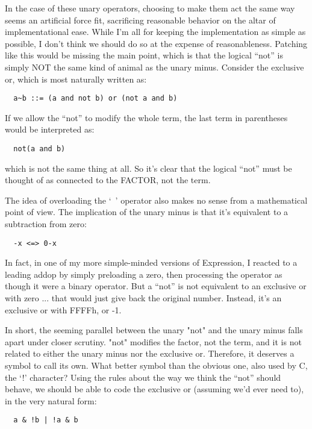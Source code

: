 In the case of these unary operators, choosing to make them act the same way seems an artificial force fit, sacrificing reasonable behavior on the altar of implementational ease. While I'm all for keeping the implementation as simple as possible, I don't think we should do so at the expense of reasonableness. Patching like this would be missing the main point, which is that the logical ``not'' is simply NOT the same kind of animal as the unary minus. Consider the exclusive or, which is most naturally written as:

\begin{verbatim}
  a~b ::= (a and not b) or (not a and b)
\end{verbatim}

If we allow the ``not'' to modify the whole term, the last term in parentheses would be interpreted as:

\begin{verbatim}
  not(a and b)
\end{verbatim}

which is not the same thing at all. So it's clear that the logical ``not'' must be thought of as connected to the FACTOR, not the term.

The idea of overloading the `~' operator also makes no sense from a mathematical point of view. The implication of the unary minus is that it's equivalent to a subtraction from zero:

\begin{verbatim}
  -x <=> 0-x
\end{verbatim}

In fact, in one of my more simple-minded versions of Expression, I reacted to a leading addop by simply preloading a zero, then processing the operator as though it were a binary operator. But a ``not'' is not equivalent to an exclusive or with zero ... that would just give back the original number. Instead, it's an exclusive or with FFFFh, or -1.

In short, the seeming parallel between the unary "not" and the unary minus falls apart under closer scrutiny. "not" modifies the factor, not the term, and it is not related to either the unary minus nor the exclusive or. Therefore, it deserves a symbol to call its own. What better symbol than the obvious one, also used by C, the `!' character?  Using the rules about the way we think the ``not'' should behave, we should be able to code the exclusive or (assuming we'd ever need to), in the very natural form:

\begin{verbatim}
  a & !b | !a & b
\end{verbatim}

